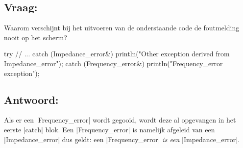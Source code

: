 \begin{cpplstShortInline}
\subsection*{Vraag:} 
Waarom verschijnt bij het uitvoeren van de onderstaande code de foutmelding  nooit op het scherm?

\begin{cpplstfragment}
    try {
    //  ...
    } catch (Impedance_error&) {
        println("Other exception derived from Impedance_error");
    } catch (Frequency_error&) {
        println("Frequency_error exception");
    }
\end{cpplstfragment}

\subsection*{Antwoord:}
Als er een |Frequency_error|  wordt gegooid, wordt deze al opgevangen in het eerste |catch| blok.
Een |Frequency_error| is namelijk afgeleid van een |Impedance_error| dus geldt: een |Frequency_error| \emph{is een} |Impedance_error|.


\end{cpplstShortInline}
